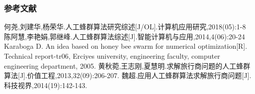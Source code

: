 \begin{frame}
	\frametitle{参考文献}
	\begin{thebibliography}{123456} 
	 何尧,刘建华,杨荣华.人工蜂群算法研究综述[J/OL].计算机应用研究,2018(05):1-8
	 陈阿慧,李艳娟,郭继峰.人工蜂群算法综述[J].智能计算机与应用,2014,4(06):20-24
	 Karaboga D. An idea based on honey bee swarm for numerical optimization[R]. Technical report-tr06, Erciyes university, engineering faculty, computer engineering department, 2005.
	 黄秋菀,王志刚,夏慧明.求解旅行商问题的人工蜂群算法[J].价值工程,2013,32(09):206-207.
	 魏超.应用人工蜂群算法求解旅行商问题[J].科技视界,2014(19):142-143.
	\end{thebibliography}
\end{frame}
